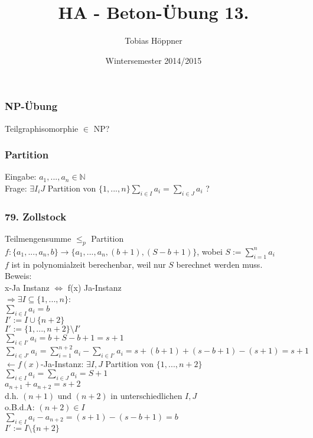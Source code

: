 \documentclass[ngerman,a4paper]{report}
\author{Tobias Höppner}
\title{HA - Beton-Übung 13.}
\date{Wintersemester 2014/2015}
\renewcommand{\maketitle}{}
\begin{document}
 
\maketitle 

\subsubsection*{NP-Übung}
Teilgraphisomorphie $\in $ NP?

\subsubsection*{Partition}

Eingabe: $a_1,...,a_n \in \mathbb{N}$\\
Frage: $\exists I_i J $ Partition von $\{1,...,n\} \sum_{i \in I} a_i = \sum_{i \in J} a_i$ ?\\

\subsubsection*{79. Zollstock}
Teilmengensumme $\leq_p$ Partition\\
$f: \{a_1,...,a_n, b\} \rightarrow \{a_1,...,a_n, (b+1),(S-b+1)\}$, wobei $S := \sum_{i=1}^n a_i$\\
$f$ ist in polynomialzeit berechenbar, weil nur $S$ berechnet werden muss.\\
Beweis:\\
x-Ja Instanz $\Leftrightarrow$ f(x) Ja-Instanz\\
$\Rightarrow \exists I \subseteq \{1,...,n\}$:\\
$\sum_{i \in I} a_i = b$\\
$I' := I \cup \{n+2\}$\\
$I' := \{1,...,n+2\} \setminus I'$\\
$\sum_{i \in I'} a_i = b + S - b +1 = s+1$\\
$\sum_{i \in J'} a_i = \sum_{i=1}^{n+2} a_i - \sum_{i \in I'} a_i = s + (b+1)+(s-b+1)-(s+1) = s+1$\\
$\leftarrow f(x)$-Ja-Instanz:
$\exists I, J $ Partition von $\{1,...,n+2\}$\\
$\sum_{i \in I} a_i = \sum_{i \in J} a_i = S+1$\\
$a_{n+1} + a_{n+2} = s+2$\\
d.h. $(n+1)$ und $(n+2)$ in unterschiedlichen $I,J$\\
o.B.d.A: $(n+2) \in I$\\
$\sum_{i \in I} a_i - a_{n+2} = (s+1)-(s-b+1) = b$\\
$I' := I \setminus \{n+2\}$\\
\end{document}
